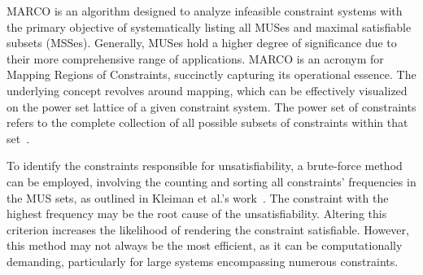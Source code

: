     
    MARCO is an algorithm designed to analyze infeasible constraint systems with the primary objective of systematically listing all MUSes and maximal satisfiable subsets (MSSes). Generally, MUSes hold a higher degree of significance due to their more comprehensive range of applications.
    MARCO is an acronym for Mapping Regions of Constraints, succinctly capturing its operational essence. The underlying concept revolves around mapping, which can be effectively visualized on the power set lattice of a given constraint system. The power set of constraints refers to the complete collection of all possible subsets of constraints within that set~\cite{liffiton2016fast}.
 
    
    To identify the constraints responsible for unsatisfiability, a brute-force method can be employed, involving the counting and sorting all constraints' frequencies in the MUS sets, as outlined in Kleiman et al.'s work~\cite{kleiman2009brute}. The constraint with the highest frequency may be the root cause of the unsatisfiability. Altering this criterion increases the likelihood of rendering the constraint satisfiable. However, this method may not always be the most efficient, as it can be computationally demanding, particularly for large systems encompassing numerous constraints.
    
